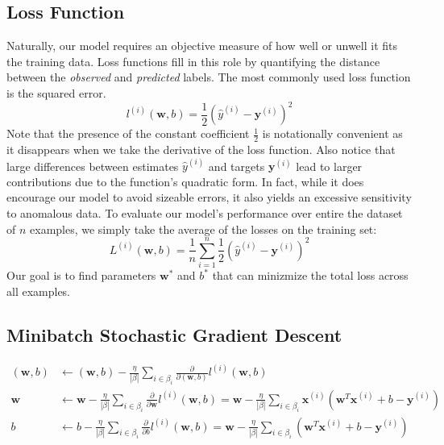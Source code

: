 \documentclass[a4paper,12pt]{article}
\theoremstyle{definition}
\begin{document}
\subsection*{Loss Function}
Naturally, our model requires an objective measure of how well or unwell it fits the training data.
Loss functions fill in this role by quantifying the distance between the \textit{observed} and \textit{predicted}
labels. The most commonly used loss function is the squared error.
\begin{equation}
    l^{(i)}(\mathbf{w},b) = \frac{1}{2}(\hat{y}^{(i)}-\mathbf{y}^{(i)})^2
\end{equation}
Note that the presence of the constant coefficient $\frac{1}{2}$ is notationally convenient as it disappears when we
take the derivative of the loss function. Also notice that large differences between estimates $\hat{y}^{(i)}$
and targets $\mathbf{y}^{(i)}$ lead to larger contributions due to the function's quadratic form. In fact, while
it does encourage our model to avoid sizeable errors, it also yields an excessive sensitivity to anomalous data.
To evaluate our model's performance over entire the dataset of $n$ examples, we simply take the average of
the losses on the training set:
\begin{equation}
    L^{(i)}(\mathbf{w},b) = \frac{1}{n}\sum_{i=1}^{n}\frac{1}{2}(\hat{y}^{(i)}-\mathbf{y}^{(i)})^2
\end{equation}
Our goal is to find parameters $\mathbf{w}^*$ and $b^*$ that can minizmize the total loss across all examples.

\subsection*{Minibatch Stochastic Gradient Descent}
\begin{equation*}
    \begin{aligned}
        (\mathbf{w},b) & \leftarrow (\mathbf{w},b) - \frac{\eta}{|\beta|}\sum_{i\in\beta_i}\frac{\partial}{\partial(\mathbf{w},b)}l^{(i)}(\mathbf{w},b)                                                                                                                   \\
        \mathbf{w}     & \leftarrow \mathbf{w} - \frac{\eta}{|\beta|}\sum_{i\in\beta_i}\frac{\partial}{\partial\mathbf{w}}l^{(i)}(\mathbf{w},b) = \mathbf{w}- \frac{\eta}{|\beta|}\sum_{i\in\beta_i}\mathbf{x}^{(i)}(\mathbf{w}^T\mathbf{x}^{(i)} + b - \mathbf{y}^{(i)}) \\
        b              & \leftarrow b - \frac{\eta}{|\beta|}\sum_{i\in\beta_i}\frac{\partial}{\partial b}l^{(i)}(\mathbf{w},b) = \mathbf{w}- \frac{\eta}{|\beta|}\sum_{i\in\beta_i}(\mathbf{w}^T\mathbf{x}^{(i)} + b - \mathbf{y}^{(i)})
    \end{aligned}
\end{equation*}
\end{document}
